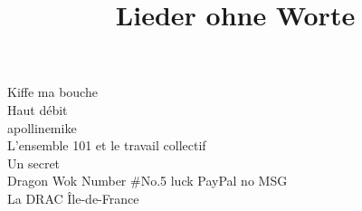 \documentclass{article}
\title{Lieder ohne Worte}
\date{}
\begin{document}
\maketitle
\thispagestyle{empty}
{\centering Kiffe ma bouche \\}
{\centering Haut débit \\}
{\centering apollinemike \\}
{\centering L'ensemble 101 et le travail collectif \\}
{\centering Un secret \\}
{\centering Dragon Wok Number \#No.5 luck PayPal no MSG \\}
{\centering La DRAC Île-de-France \\}
\end{document}

